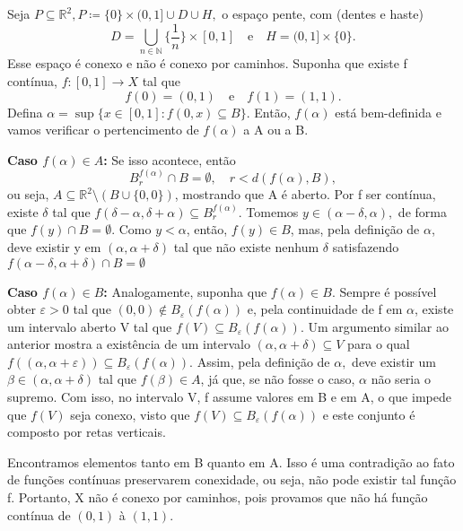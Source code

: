 \documentclass[metric_notes.tex]{subfiles}
\begin{document}
\begin{example}
	Seja \(P\subseteq{\mathbb{R}^{2}}, P\coloneqq \{0\}\times (0,1]\cup D\cup H,\) o espaço pente, com (dentes e haste)
	\[
		D = \bigcup_{n\in \mathbb{N}}^{}{\biggl\{\frac{1}{n}\biggr\}\times[0, 1]}\quad\text{e}\quad H = (0, 1]\times\{0\}.
	\]
	Esse espaço é conexo e não é conexo por caminhos. Suponha que existe f contínua, \(f:[0, 1]\rightarrow X\) tal que
	\[
		f(0) = (0, 1)\quad\text{e}\quad f(1) = (1,1).
	\]
	Defina \(\alpha  = \sup{\{x\in[0, 1]: f(0, x)\subseteq{B}\}}\). Então, \(f(\alpha )\) está bem-definida e vamos verificar o pertencimento de \(f(\alpha )\) a A ou a B.

	\textbf{Caso \(f(\alpha )\in A\):}
	Se isso acontece, então
	\[
		B_{r}^{f(\alpha )}\cap B = \emptyset,\quad r < d(f(\alpha ), B),
	\]
	ou seja, \(A\subseteq{\mathbb{R}^{2}}\setminus{(B\cup \{0, 0\})}\), mostrando que A é aberto. Por f ser contínua, existe \(\delta \) tal que
	\(f(\delta -\alpha , \delta +\alpha ) \subseteq{B_{r}^{f(\alpha )}}.\) Tomemos \(y\in (\alpha -\delta , \alpha ),\) de forma que \(f(y)\cap B = \emptyset\).
	Como \(y < \alpha \), então, \(f(y)\in B\), mas, pela definição de \(\alpha \), deve existir y em \((\alpha , \alpha +\delta )\) tal que não existe nenhum \(\delta \)
	satisfazendo \(f(\alpha -\delta ,\alpha +\delta )\cap B = \emptyset \)

	\textbf{Caso \(f(\alpha )\in B\):}
	Analogamente, suponha que \(f(\alpha )\in B\). Sempre é possível obter \(\varepsilon >0\) tal que \((0, 0)\not\in B_{\varepsilon }(f(\alpha ))\) e, pela continuidade
	de f em \(\alpha \), existe um intervalo aberto V tal que \(f(V)\subseteq{B_{\varepsilon }(f(\alpha ))}.\) Um argumento similar ao anterior mostra a existência de
	um intervalo \((\alpha , \alpha +\delta ) \subseteq{V}\) para o qual \(f((\alpha , \alpha +\varepsilon ))\subseteq{B_{\varepsilon }(f(\alpha ))}.\) Assim, pela definição
	de \(\alpha ,\) deve existir um \(\beta \in (\alpha , \alpha +\delta )\) tal que \(f(\beta)\in A\), já que, se não fosse o caso, \(\alpha \) não seria o supremo.
	Com isso, no intervalo V, f assume valores em B e em A, o que impede que \(f(V)\) seja conexo, visto que \(f(V)\subseteq{B_{\varepsilon }(f(\alpha ))}\) e este conjunto
	é composto por retas verticais.

	Encontramos elementos tanto em B quanto em A. Isso é uma contradição ao fato de funções contínuas preservarem conexidade, ou seja, não pode existir tal função f. Portanto,
	X não é conexo por caminhos, pois provamos que não há função contínua de \((0, 1)\) à \((1, 1)\).
\end{example}
\end{document}
